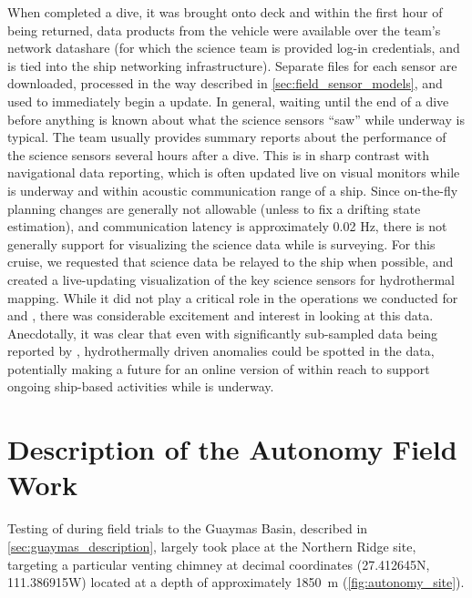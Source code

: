 When \Sentry completed a dive, it was brought onto deck and within the first hour of being returned, data products from the vehicle were available over the \Sentry team's network datashare (for which the science team is provided log-in credentials, and is tied into the ship networking infrastructure). Separate files for each sensor are downloaded, processed in the way described in \cref{sec:field_sensor_models}, and used to immediately begin a \PHUMES update. In general, waiting until the end of a dive before anything is known about what the science sensors ``saw'' while underway is typical. The \Sentry team usually provides summary reports about the performance of the science sensors several hours after a dive. This is in sharp contrast with navigational data reporting, which is often updated live on visual monitors while \Sentry is underway and within acoustic communication range of a ship. Since on-the-fly planning changes are generally not allowable (unless to fix a drifting \Sentry state estimation), and communication latency is approximately 0.02 Hz, there is not generally support for visualizing the science data while \Sentry is surveying. For this cruise, we requested that science data be relayed to the ship when possible, and created a live-updating visualization of the key science sensors for hydrothermal mapping. While it did not play a critical role in the operations we conducted for \PHUMES and \PHORTEX, there was considerable excitement and interest in looking at this data. Anecdotally, it was clear that even with significantly sub-sampled data being reported by \Sentry, hydrothermally driven anomalies could be spotted in the data, potentially making a future for an online version of \PHUMES within reach to support ongoing ship-based activities while \Sentry is underway. 



\section{Description of the Autonomy Field Work}
Testing of \PHORTEX during field trials to the Guaymas Basin, described in \cref{sec:guaymas_description}, largely took place at the Northern Ridge site, targeting a particular venting chimney at decimal coordinates (27.412645N, 111.386915W) located at a depth of approximately \SI{1850}{\meter} (\cref{fig:autonomy_site}). 

